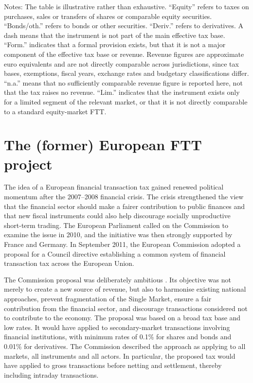 \documentclass[../../main]{subfiles}
\begin{document}
\begin{landscape}
\begin{flushleft}
\scriptsize
Notes: The table is illustrative rather than exhaustive. ``Equity'' refers to taxes on purchases, sales or transfers of shares or comparable equity securities. ``Bonds/oth.'' refers to bonds or other securities. ``Deriv.'' refers to derivatives. A dash means that the instrument is not part of the main effective tax base. ``Form.'' indicates that a formal provision exists, but that it is not a major component of the effective tax base or revenue. Revenue figures are approximate euro equivalents and are not directly comparable across jurisdictions, since tax bases, exemptions, fiscal years, exchange rates and budgetary classifications differ. ``n.a.'' means that no sufficiently comparable revenue figure is reported here, not that the tax raises no revenue. ``Lim.'' indicates that the instrument exists only for a limited segment of the relevant market, or that it is not directly comparable to a standard equity-market FTT.
\end{flushleft}

\endgroup

\restoregeometry
\end{landscape}


\section{The (former) European FTT project}

The idea of a European financial transaction tax gained renewed political momentum after the 2007--2008 financial crisis. The crisis strengthened the view that the financial sector should make a fairer contribution to public finances and that new fiscal instruments could also help discourage socially unproductive short-term trading. The European Parliament called on the Commission to examine the issue in 2010, and the initiative was then strongly supported by France and Germany. In September 2011, the European Commission adopted a proposal for a Council directive establishing a common system of financial transaction tax across the European Union.

The Commission proposal was deliberately ambitious \citep{Gabor2016}. Its objective was not merely to create a new source of revenue, but also to harmonise existing national approaches, prevent fragmentation of the Single Market, ensure a fair contribution from the financial sector, and discourage transactions considered not to contribute to the economy. The proposal was based on a broad tax base and low rates. It would have applied to secondary-market transactions involving financial institutions, with minimum rates of 0.1\% for shares and bonds and 0.01\% for derivatives. The Commission described the approach as applying to all markets, all instruments and all actors. In particular, the proposed tax would have applied to gross transactions before netting and settlement, thereby including intraday transactions.
\end{document}
